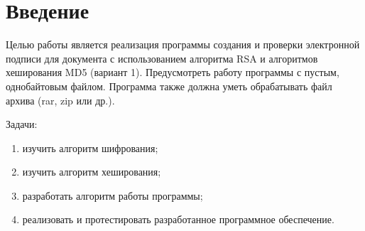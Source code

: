 \section*{Введение}

Целью работы является реализация программы создания и проверки электронной
подписи для документа с использованием алгоритма RSA и алгоритмов хеширования
MD5 (вариант 1). Предусмотреть работу программы с пустым, однобайтовым
файлом. Программа также должна уметь обрабатывать файл архива (rar, zip или
др.).

Задачи:
\begin{enumerate}
    \item изучить алгоритм шифрования;
    \item изучить алгоритм хеширования;
    \item разработать алгоритм работы программы;
    \item реализовать и протестировать разработанное программное обеспечение.
\end{enumerate}

\pagebreak

